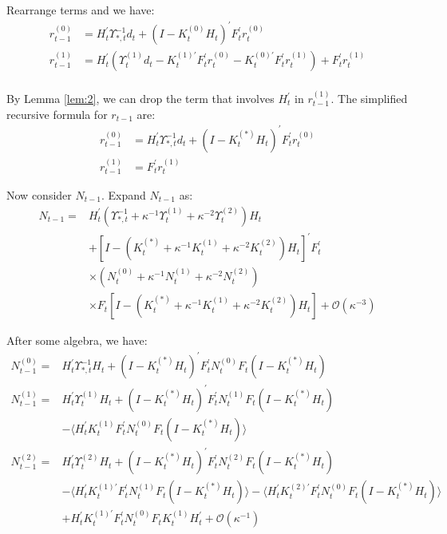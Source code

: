 \documentclass[10pt, titlepage]{article}
\numberwithin{equation}{section}
\begin{document}
Rearrange terms and we have:
\begin{align*}
    r_{t-1}^{(0)} &= H_t^{'}\Upsilon_{*,t}^{-1}d_t + (I-K_{t}^{(0)}H_t)^{'}F_t^{'}r_t^{(0)} \\
    r_{t-1}^{(1)} &= H_t^{'}(\Upsilon_t^{(1)}d_t-K_t^{(1)'}F_t^{'}r_t^{(0)}-K_t^{(0)'}F_t^{'}r_t^{(1)})+F_t^{'}r_t^{(1)} \\
\end{align*}

By Lemma \ref{lem:2}, we can drop the term that involves $H_t^{'}$ in $r_{t-1}^{(1)}$. The simplified recursive formula for $r_{t-1}$ are:
\begin{align}
    r_{t-1}^{(0)} &= H_t^{'}\Upsilon_{*,t}^{-1}d_t + (I-K_{t}^{(*)}H_t)^{'}F_t^{'}r_t^{(0)} \label{eq:r_0_start} \\
    r_{t-1}^{(1)} &= F_t^{'}r_t^{(1)} \label{eq:r_0_end}
\end{align}

Now consider $N_{t-1}$. Expand $N_{t-1}$ as:
\begin{align*}
    N_{t-1} =& H_t^{'}(\Upsilon_{*,t}^{-1}+\kappa^{-1}\Upsilon_{t}^{(1)}+\kappa^{-2}\Upsilon_t^{(2)})H_t \\
    &+ [I-(K_t^{(*)}+\kappa^{-1}K_t^{(1)}+\kappa^{-2}K_t^{(2)})H_t]^{'}F_t^{'} \\
    &\times (N_t^{(0)}+\kappa^{-1}N_t^{(1)}+\kappa^{-2}N_t^{(2)}) \\
    &\times F_t[I-(K_t^{(*)}+\kappa^{-1}K_t^{(1)}+\kappa^{-2}K_t^{(2)})H_t]+\mathcal{O}(\kappa^{-3})
\end{align*}

After some algebra, we have:
\begin{align*}
    N_{t-1}^{(0)} =& H_t^{'}\Upsilon_{*,t}^{-1}H_t+(I-K_t^{(*)}H_t)^{'}F_t^{'}N_t^{(0)}F_t(I-K_t^{(*)}H_t) \\
    N_{t-1}^{(1)} =& H_t^{'}\Upsilon_t^{(1)}H_t + (I-K_t^{(*)}H_t)^{'}F_t^{'}N_t^{(1)}F_{t}(I-K_t^{(*)}H_t) \\
    &- \langle H_t^{'}K_t^{(1)}F_t^{'}N_t^{(0)}F_t(I-K_t^{(*)}H_t)\rangle \\
    N_{t-1}^{(2)} =& H_t^{'}\Upsilon_t^{(2)}H_t + (I-K_t^{(*)}H_t)^{'}F_t^{'}N_t^{(2)}F_t(I-K_t^{(*)}H_t) \\
    &- \langle H_t^{'}K_{t}^{(1)'}F_t^{'}N_t^{(1)}F_t(I-K_t^{(*)}H_t)\rangle -\langle H_t^{'}K_{t}^{(2)'}F_t^{'}N_t^{(0)}F_t(I-K_t^{(*)}H_t)\rangle \\
    &+ H_t^{'}K_t^{(1)'}F_t^{'}N_t^{(0)}F_tK_t^{(1)}H_t^{'} + \mathcal{O}(\kappa^{-1})
\end{align*}
\end{document}
